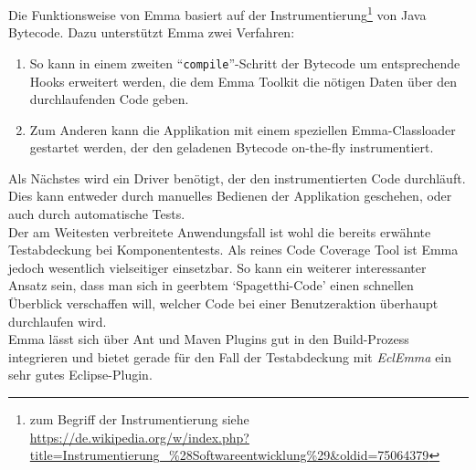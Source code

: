 Die Funktionsweise von Emma basiert auf der Instrumentierung\footnote{zum Begriff der Instrumentierung siehe \url{https://de.wikipedia.org/w/index.php?title=Instrumentierung_\%28Softwareentwicklung\%29\&oldid=75064379}} von Java Bytecode. Dazu unterstützt Emma zwei Verfahren: \begin{enumerate}
\item So kann in einem zweiten ``\verb=compile=''-Schritt der Bytecode um entsprechende Hooks erweitert werden, die dem Emma Toolkit die nötigen Daten über den durchlaufenden Code geben.
\item Zum Anderen kann die Applikation mit einem speziellen Emma-Classloader gestartet werden, der den geladenen Bytecode on-the-fly instrumentiert. 
\end{enumerate}
Als Nächstes wird ein Driver benötigt, der den instrumentierten Code durchläuft. Dies kann entweder durch manuelles Bedienen der Applikation geschehen, oder auch durch automatische Tests.\\

Der am Weitesten verbreitete Anwendungsfall ist wohl die bereits erwähnte Testabdeckung bei Komponententests. Als reines Code Coverage Tool ist Emma jedoch wesentlich vielseitiger einsetzbar. So kann ein weiterer interessanter Ansatz sein, dass man sich in geerbtem `Spagetthi-Code' einen schnellen Überblick verschaffen will, welcher Code bei einer Benutzeraktion überhaupt durchlaufen wird.\\

Emma lässt sich über Ant und Maven Plugins gut in den Build-Prozess integrieren und bietet gerade für den Fall der Testabdeckung mit \textit{EclEmma} ein sehr gutes Eclipse-Plugin.


